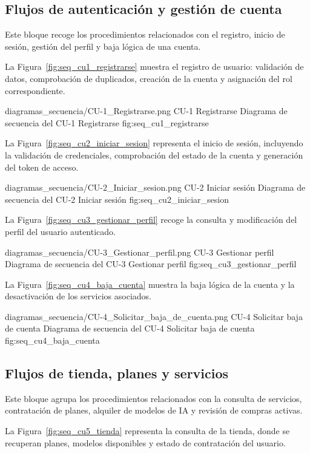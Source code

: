 \subsection{Flujos de autenticación y gestión de cuenta}

Este bloque recoge los procedimientos relacionados con el registro, inicio de sesión, gestión del perfil y baja lógica de una cuenta.

La Figura~\ref{fig:seq_cu1_registrarse} muestra el registro de usuario: validación de datos, comprobación de duplicados, creación de la cuenta y asignación del rol correspondiente.

\diagramaSecuencia
{diagramas_secuencia/CU-1_Registrarse.png}
{CU-1 Registrarse}
{Diagrama de secuencia del CU-1 Registrarse}
{fig:seq_cu1_registrarse}

La Figura~\ref{fig:seq_cu2_iniciar_sesion} representa el inicio de sesión, incluyendo la validación de credenciales, comprobación del estado de la cuenta y generación del token de acceso.

\diagramaSecuencia
{diagramas_secuencia/CU-2_Iniciar_sesion.png}
{CU-2 Iniciar sesión}
{Diagrama de secuencia del CU-2 Iniciar sesión}
{fig:seq_cu2_iniciar_sesion}

La Figura~\ref{fig:seq_cu3_gestionar_perfil} recoge la consulta y modificación del perfil del usuario autenticado.

\diagramaSecuencia
{diagramas_secuencia/CU-3_Gestionar_perfil.png}
{CU-3 Gestionar perfil}
{Diagrama de secuencia del CU-3 Gestionar perfil}
{fig:seq_cu3_gestionar_perfil}

La Figura~\ref{fig:seq_cu4_baja_cuenta} muestra la baja lógica de la cuenta y la desactivación de los servicios asociados.

\diagramaSecuencia
{diagramas_secuencia/CU-4_Solicitar_baja_de_cuenta.png}
{CU-4 Solicitar baja de cuenta}
{Diagrama de secuencia del CU-4 Solicitar baja de cuenta}
{fig:seq_cu4_baja_cuenta}

\subsection{Flujos de tienda, planes y servicios}

Este bloque agrupa los procedimientos relacionados con la consulta de servicios, contratación de planes, alquiler de modelos de IA y revisión de compras activas.

La Figura~\ref{fig:seq_cu5_tienda} representa la consulta de la tienda, donde se recuperan planes, modelos disponibles y estado de contratación del usuario.

